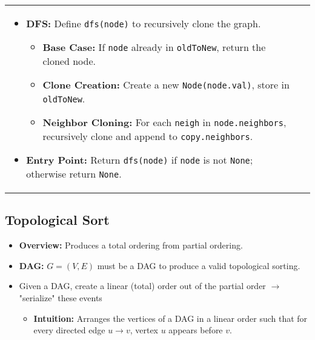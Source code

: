 \begin{summary}
\begin{center}
\begin{tabular}{ll}
{\begin{itemize}
                    \item \textbf{DFS:} Define \texttt{dfs(node)} to recursively clone the graph.
                    \begin{itemize}
                        \item \textbf{Base Case:} If \texttt{node} already in \texttt{oldToNew}, return the cloned node.
                        \item \textbf{Clone Creation:} Create a new \texttt{Node(node.val)}, store in \texttt{oldToNew}.
                        \item \textbf{Neighbor Cloning:} For each \texttt{neigh} in \texttt{node.neighbors}, recursively clone and append to \texttt{copy.neighbors}.
                    \end{itemize}
                
                    \item \textbf{Entry Point:} Return \texttt{dfs(node)} if \texttt{node} is not \texttt{None}; otherwise return \texttt{None}.
                \end{itemize}                
            } \\
        \end{tabular}
    \end{center}
\end{summary}
\newpage

\subsection{Topological Sort}
\begin{summary}
    \begin{itemize}
        \item \textbf{Overview:} Produces a total ordering from partial ordering.
        \item \textbf{DAG:} $G=(V,E)$ must be a DAG to produce a valid topological sorting. 
        \item Given a DAG, create a linear (total) order out of the partial order $\rightarrow$ "serialize" these events 
        \begin{itemize}
            \item \textbf{Intuition:} Arranges the vertices of a DAG in a linear order such that for every directed edge \( u \to v \), vertex \( u \) appears before \( v \).
        \end{itemize}
    \end{itemize}
\end{summary}

